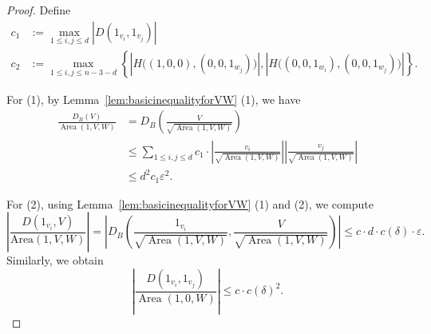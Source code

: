 \documentclass[10pt,a4paper]{amsart}
\begin{document}
\begin{proof}
Define
\begin{align*}
c_1 &:= \max_{1\le i,j\le d} |D(1_{v_i},1_{v_j})|\\    
c_2 &:= \max_{1\le i,j\le n-3-d} \left\{|H\big((1,0,0),(0,0,1_{w_j})\big)|, |H\big((0,0,1_{w_i}),(0,0,1_{w_j})\big)|\right\}.
\end{align*}

For (1), by Lemma~\ref{lem:basicinequalityforVW} (1), we have
\begin{align*}
    \frac{D_B(V)}{\operatorname{Area}(1,V,W)}&=D_B\left(\frac{V}{\sqrt{\operatorname{Area}(1,V,W)}}\right)\\
    &\leq \sum_{1\leq i, j\leq d} c_1 \cdot \left|\frac{v_i}{\sqrt{\operatorname{Area}(1,V,W)}}\right| \left|\frac{v_j}{\sqrt{\operatorname{Area}(1,V,W)}}\right|\\
    &\leq d^2 c_1 \varepsilon^2.
\end{align*}

For (2), using Lemma~\ref{lem:basicinequalityforVW} (1) and (2), we compute
$$
\left|\frac{D(1_{v_i}, V)}{\mathrm{Area}(1,V,W)}\right| = 
\left|D_B\left(\frac{1_{v_i}}{\sqrt{\operatorname{Area}(1,V,W)}},\frac{V}{\sqrt{\operatorname{Area}(1,V,W)}}\right)\right|
\leq c \cdot d \cdot c(\delta) \cdot \varepsilon.
$$
Similarly, we obtain
$$
\left|\frac{D(1_{v_i},1_{v_j})}{\operatorname{Area}(1,0,W)}\right|\leq c \cdot c(\delta)^2.
$$


\end{proof}
\end{document}
